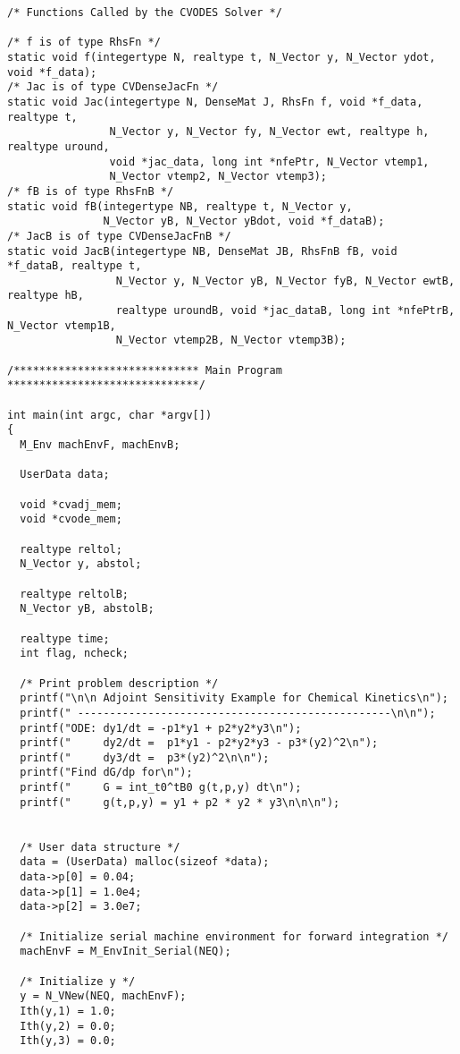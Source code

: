\begin{verbatim}
/* Functions Called by the CVODES Solver */

/* f is of type RhsFn */
static void f(integertype N, realtype t, N_Vector y, N_Vector ydot, void *f_data);
/* Jac is of type CVDenseJacFn */
static void Jac(integertype N, DenseMat J, RhsFn f, void *f_data, realtype t,
                N_Vector y, N_Vector fy, N_Vector ewt, realtype h, realtype uround,
                void *jac_data, long int *nfePtr, N_Vector vtemp1,
                N_Vector vtemp2, N_Vector vtemp3);
/* fB is of type RhsFnB */
static void fB(integertype NB, realtype t, N_Vector y, 
               N_Vector yB, N_Vector yBdot, void *f_dataB);
/* JacB is of type CVDenseJacFnB */
static void JacB(integertype NB, DenseMat JB, RhsFnB fB, void *f_dataB, realtype t,
                 N_Vector y, N_Vector yB, N_Vector fyB, N_Vector ewtB, realtype hB, 
                 realtype uroundB, void *jac_dataB, long int *nfePtrB, N_Vector vtemp1B,
                 N_Vector vtemp2B, N_Vector vtemp3B);

/***************************** Main Program ******************************/

int main(int argc, char *argv[])
{
  M_Env machEnvF, machEnvB;

  UserData data;

  void *cvadj_mem;
  void *cvode_mem;

  realtype reltol;
  N_Vector y, abstol;

  realtype reltolB;
  N_Vector yB, abstolB;

  realtype time;
  int flag, ncheck;

  /* Print problem description */
  printf("\n\n Adjoint Sensitivity Example for Chemical Kinetics\n");
  printf(" -------------------------------------------------\n\n");
  printf("ODE: dy1/dt = -p1*y1 + p2*y2*y3\n");
  printf("     dy2/dt =  p1*y1 - p2*y2*y3 - p3*(y2)^2\n");
  printf("     dy3/dt =  p3*(y2)^2\n\n");
  printf("Find dG/dp for\n");
  printf("     G = int_t0^tB0 g(t,p,y) dt\n");
  printf("     g(t,p,y) = y1 + p2 * y2 * y3\n\n\n");


  /* User data structure */
  data = (UserData) malloc(sizeof *data);
  data->p[0] = 0.04;
  data->p[1] = 1.0e4;
  data->p[2] = 3.0e7;

  /* Initialize serial machine environment for forward integration */
  machEnvF = M_EnvInit_Serial(NEQ);

  /* Initialize y */
  y = N_VNew(NEQ, machEnvF); 
  Ith(y,1) = 1.0;                
  Ith(y,2) = 0.0;
  Ith(y,3) = 0.0;


\end{verbatim}
